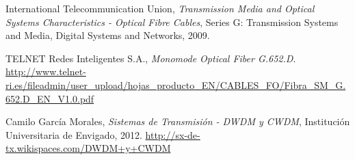
%
%
%
	
%

\begin{thebibliography}{9}

  International Telecommunication Union,
  \emph{Transmission Media and Optical Systems Characteristics - Optical Fibre Cables},
  Series G: Transmission Systems and Media, Digital Systems and Networks,
  2009.

  TELNET Redes Inteligentes S.A.,
  \emph{Monomode Optical Fiber G.652.D}.
  \url{http://www.telnet-ri.es/fileadmin/user_upload/hojas_producto_EN/CABLES_FO/Fibra_SM_G.652.D_EN_V1.0.pdf}
  
  Camilo Garc\'ia Morales,
  \emph{Sistemas de Transmisi\'on - DWDM y CWDM},
  Instituci\'on Universitaria de Envigado,
  2012.
  \url{http://sx-de-tx.wikispaces.com/DWDM+y+CWDM}

\end{thebibliography}